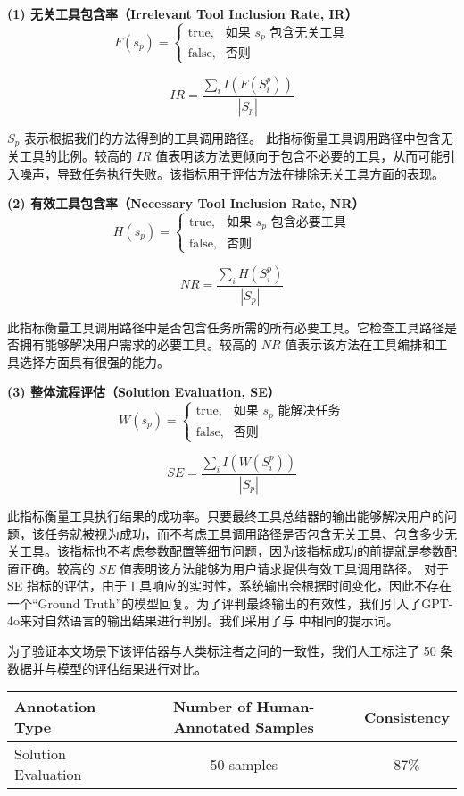 \noindent \textbf{(1) 无关工具包含率（Irrelevant Tool Inclusion Rate, IR）}
\[
F(s_p) = 
\begin{cases} 
\text{true}, & \text{如果 } s_p \text{ 包含无关工具} \\ 
\text{false}, & \text{否则} 
\end{cases}
\]

\[
IR = \frac{\sum_{i} I(F(S_i^p))}{|S_p|}
\]

\( S_p \) 表示根据我们的方法得到的工具调用路径。  
此指标衡量工具调用路径中包含无关工具的比例。较高的 \( IR \) 值表明该方法更倾向于包含不必要的工具，从而可能引入噪声，导致任务执行失败。该指标用于评估方法在排除无关工具方面的表现。

\noindent \textbf{(2) 有效工具包含率（Necessary Tool Inclusion Rate, NR）}
\[
H(s_p) = 
\begin{cases} 
\text{true}, & \text{如果 } s_p \text{ 包含必要工具} \\ 
\text{false}, & \text{否则} 
\end{cases}
\]

\[
NR = \frac{\sum_{i} H(S_i^p)}{|S_p|}
\]

此指标衡量工具调用路径中是否包含任务所需的所有必要工具。它检查工具路径是否拥有能够解决用户需求的必要工具。较高的 \( NR \) 值表示该方法在工具编排和工具选择方面具有很强的能力。

\noindent \textbf{(3) 整体流程评估（Solution Evaluation, SE）}
\[
W(s_p) = 
\begin{cases} 
\text{true}, & \text{如果 } s_p \text{ 能解决任务} \\ 
\text{false}, & \text{否则} 
\end{cases}
\]

\[
SE = \frac{\sum_{i} I(W(S_i^p))}{|S_p|}
\]

此指标衡量工具执行结果的成功率。只要最终工具总结器的输出能够解决用户的问题，该任务就被视为成功，而不考虑工具调用路径是否包含无关工具、包含多少无关工具。该指标也不考虑参数配置等细节问题，因为该指标成功的前提就是参数配置正确。较高的 \( SE \) 值表明该方法能够为用户请求提供有效工具调用路径。
对于 SE 指标的评估，由于工具响应的实时性，系统输出会根据时间变化，因此不存在一个“Ground Truth”的模型回复。为了评判最终输出的有效性，我们引入了GPT-4o来对自然语言的输出结果进行判别。我们采用了与 \cite{Liu2023a} 中相同的提示词。

为了验证本文场景下该评估器与人类标注者之间的一致性，我们人工标注了 50 条数据并与模型的评估结果进行对比。

\begin{table}[h]
  \centering
  \label{tab:consistency}
  \begin{tabular}{l|c|c}
  \toprule
  \textbf{Annotation Type} & \textbf{Number of Human-Annotated Samples} & \textbf{Consistency} \\ \midrule
  Solution Evaluation               & 50 samples                                & 87\%                 \\
  \bottomrule
  \end{tabular}
\end{table}

